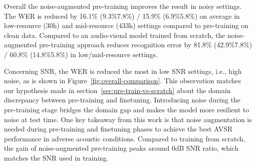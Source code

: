 Overall the noise-augmented pre-training improves the result in noisy settings. The WER is reduced by 16.1\% (9.3\%7.8\%) / 15.9\% (6.9\%5.8\%) on average in low-resource (30h) and mid-resource (433h) settings compared to pre-training on clean data. Compared to an audio-visual model trained from scratch, the noise-augmented pre-training approach reduces recognition error by 81.8\% (42.9\%7.8\%) / 60.8\% (14.8\%5.8\%) in low/mid-resource settings.

\begin{table}[htb]
    \centering
    \caption{Comparison among BASE models with different pre-training configurations and input modalities. The model is fine-tuned with 30h labeled data. C: clean audio, N: noisy audio. The N-WER is averaged over 4 noise types and 5 SNR ratios.}\label{tab:avg-base-comparison}
\end{table}


 Concerning SNR, the WER is reduced the most in low SNR settings, i.e., high noise, as is shown in Figure~\ref{fig:overall-comparison}. This observation matches our hypothesis made in section~\ref{sec:pre-train-vs-scratch} about the domain discrepancy between pre-training and finetuning. Introducing noise during the pre-training stage bridges the domain gap and makes the model more resilient to noise at test time. One key takeaway from this work is that noise augmentation is needed during pre-training and finetuning phases to achieve the best AVSR performance in adverse acoustic conditions. Compared to training from scratch, the gain of noise-augmented pre-training peaks around 0dB SNR ratio, which matches the SNR used in training. 

